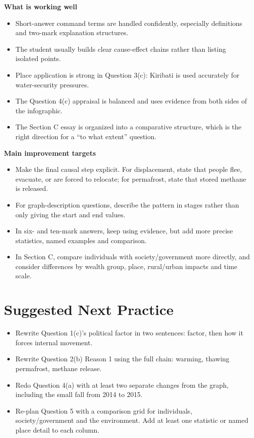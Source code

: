 \documentclass[11pt]{article}
\begin{document}
\textbf{What is working well}
\begin{itemize}
  \item Short-answer command terms are handled confidently, especially definitions and two-mark explanation structures.
  \item The student usually builds clear cause-effect chains rather than listing isolated points.
  \item Place application is strong in Question 3(c): Kiribati is used accurately for water-security pressures.
  \item The Question 4(c) appraisal is balanced and uses evidence from both sides of the infographic.
  \item The Section C essay is organized into a comparative structure, which is the right direction for a ``to what extent'' question.
\end{itemize}

\textbf{Main improvement targets}
\begin{itemize}
  \item Make the final causal step explicit. For displacement, state that people flee, evacuate, or are forced to relocate; for permafrost, state that stored methane is released.
  \item For graph-description questions, describe the pattern in stages rather than only giving the start and end values.
  \item In six- and ten-mark answers, keep using evidence, but add more precise statistics, named examples and comparison.
  \item In Section C, compare individuals with society/government more directly, and consider differences by wealth group, place, rural/urban impacts and time scale.
\end{itemize}

\section*{Suggested Next Practice}

\begin{itemize}
  \item Rewrite Question 1(c)'s political factor in two sentences: factor, then how it forces internal movement.
  \item Rewrite Question 2(b) Reason 1 using the full chain: warming, thawing permafrost, methane release.
  \item Redo Question 4(a) with at least two separate changes from the graph, including the small fall from 2014 to 2015.
  \item Re-plan Question 5 with a comparison grid for individuals, society/government and the environment. Add at least one statistic or named place detail to each column.
\end{itemize}
\end{document}
